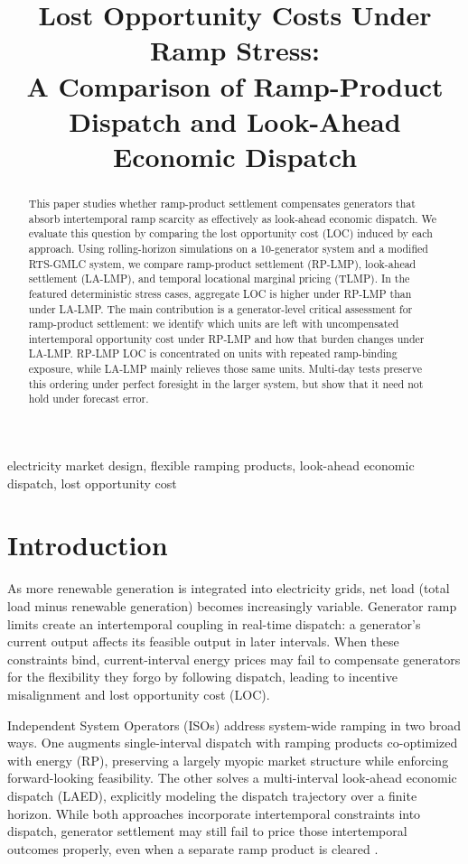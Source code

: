 \documentclass[conference]{IEEEtran}
\title{Lost Opportunity Costs Under Ramp Stress:\\
A Comparison of Ramp-Product Dispatch and Look-Ahead Economic Dispatch}
\author{\IEEEauthorblockN{Aidan Looney, Qian Zhang, and Le Xie}
\IEEEauthorblockA{
Harvard John A. Paulson School of Engineering and Applied Sciences\\
Allston, MA, USA\\
Email: \{aidanlooney, qianzhang\}@g.harvard.edu, xie@seas.harvard.edu
}}
\begin{document}
\maketitle

\begin{abstract}
This paper studies whether ramp-product settlement compensates generators that absorb intertemporal ramp scarcity as effectively as look-ahead economic dispatch. We evaluate this question by comparing the lost opportunity cost (LOC) induced by each approach. Using rolling-horizon simulations on a 10-generator system and a modified RTS-GMLC system, we compare ramp-product settlement (RP-LMP), look-ahead settlement (LA-LMP), and temporal locational marginal pricing (TLMP). In the featured deterministic stress cases, aggregate LOC is higher under RP-LMP than under LA-LMP. The main contribution is a generator-level critical assessment for ramp-product settlement: we identify which units are left with uncompensated intertemporal opportunity cost under RP-LMP and how that burden changes under LA-LMP. RP-LMP LOC is concentrated on units with repeated ramp-binding exposure, while LA-LMP mainly relieves those same units. Multi-day tests preserve this ordering under perfect foresight in the larger system, but show that it need not hold under forecast error.
\end{abstract}

\begin{IEEEkeywords}
electricity market design, flexible ramping products, look-ahead economic dispatch, lost opportunity cost
\end{IEEEkeywords}

\section{Introduction}
As more renewable generation is integrated into electricity grids, net load (total load minus renewable generation) becomes increasingly variable. Generator ramp limits create an intertemporal coupling in real-time dispatch: a generator's current output affects its feasible output in later intervals. When these constraints bind, current-interval energy prices may fail to compensate generators for the flexibility they forgo by following dispatch, leading to incentive misalignment and lost opportunity cost (LOC).

Independent System Operators (ISOs) address system-wide ramping in two broad ways. One augments single-interval dispatch with ramping products co-optimized with energy (RP), preserving a largely myopic market structure while enforcing forward-looking feasibility. The other solves a multi-interval look-ahead economic dispatch (LAED), explicitly modeling the dispatch trajectory over a finite horizon. While both approaches incorporate intertemporal constraints into dispatch, generator settlement may still fail to price those intertemporal outcomes properly, even when a separate ramp product is cleared \cite{Zhang2026_PSCC}.
\end{document}
